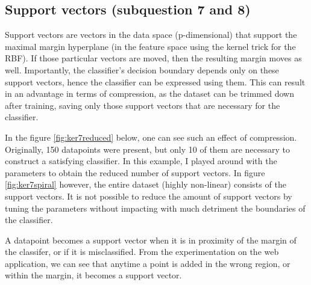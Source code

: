 \documentclass[11pt, a4paper]{article}
\begin{document}
\subsection{Support vectors (subquestion 7 and 8)}

Support vectors are vectors in the data space (p-dimensional) that
support the maximal margin hyperplane (in the feature space using the
kernel trick for the RBF). If those particular vectors are moved, then
the resulting margin moves as well. Importantly, the classifier's
decision boundary depends only on these support vectors, hence the
classifier can be expressed using them. This can result in an
advantage in terms of compression, as the dataset can be trimmed down
after training, saving only those support vectors that are necessary
for the classifier.

In the figure \ref{fig:ker7reduced} below, one can see such an effect
of compression. Originally, 150 datapoints were present, but only 10
of them are necessary to construct a satisfying classifier. In this
example, I played around with the parameters to obtain the reduced
number of support vectors. In figure \ref{fig:ker7spiral} however, the
entire dataset (highly non-linear) consists of the support vectors. It
is not possible to reduce the amount of support vectors by tuning the
parameters without impacting with much detriment the boundaries of the
classifier.

A datapoint becomes a support vector when it is in proximity of the
margin of the classifer, or if it is misclassified. From the
experimentation on the web application, we can see that anytime a
point is added in the wrong region, or within the margin, it becomes a
support vector.
\end{document}
